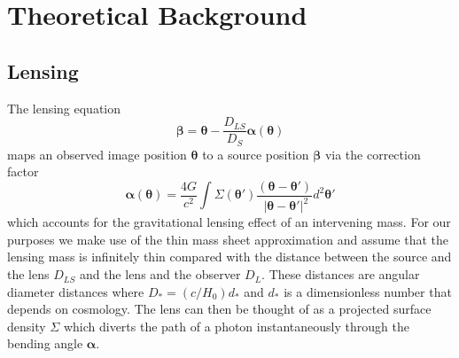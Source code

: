 \documentclass[onecolumn,galley]{mn2e}
\renewcommand{\vec}[1]{\ensuremath{\boldsymbol{#1}}}
\begin{document}



\section{Theoretical Background}

\subsection{Lensing}

The lensing equation
%
\begin{equation}
\vec\beta = \vec\theta - \frac{D_{LS}}{D_S}\vec\alpha(\vec\theta)
\label{lensing equation}
\end{equation}
%
maps an observed image position $\vec\theta$ to a source position $\vec\beta$
via the correction factor 
%
\begin{equation}
\vec\alpha(\vec\theta) = \frac{4G}{c^2} \int \Sigma(\vec\theta')\frac{(\vec\theta - \vec\theta')}{\ |\vec\theta - \vec\theta'|^2}d^2\vec\theta'
\end{equation}
%
which accounts for the gravitational lensing effect of an intervening mass. For
our purposes we make use of the thin mass sheet approximation and assume that
the lensing mass is infinitely thin compared with the distance between the
source and the lens $D_{LS}$ and the lens and the observer $D_{L}$. These
distances are angular diameter distances where $D_* = (c/H_0)d_*$ and $d_*$ is
a dimensionless number that depends on cosmology.  The lens can then be thought
of as a projected surface density $\Sigma$ which diverts the path of a photon
instantaneously through the bending angle $\vec\alpha$.
\end{document}
